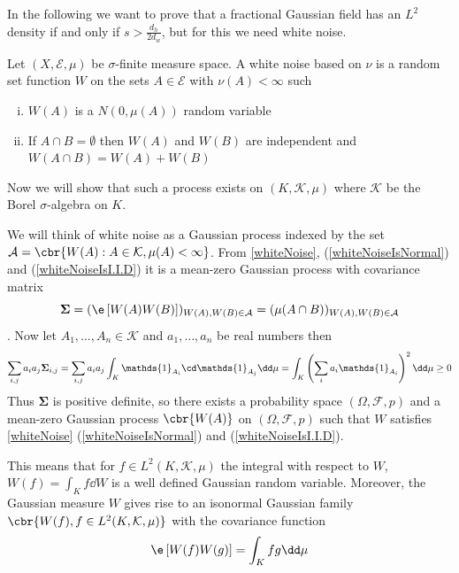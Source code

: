 In the following we want to prove that a fractional Gaussian field has an $L^2$ density if and only if $s > \frac{d_h}{2d_w}$, but for this we need white noise.

\begin{defi}\label{whiteNoise}
	Let $(X, \mathcal{E}, \mu)$ be $\sigma$-finite measure space. A white noise based on $\nu$ is a random set function $W$ on the sets $A \in \mathcal{E}$ with $\nu(A) < \infty$ such
	\begin{enumerate}[(i)]
		\item $W(A)$ is a $N(0, \mu(A))$ random variable \label{whiteNoiseIsNormal}
		\item If $A \cap B = \emptyset$ then $W(A)$ and $W(B)$ are independent and $W(A \cap B) = W(A) + W(B)$ \label{whiteNoiseIsI.I.D}
	\end{enumerate}
\end{defi}

Now we will show that such a process exists on $(K, \mathcal{K}, \mu)$ where  $\mathcal{K}$ be the Borel $\sigma$-algebra on $K$. 

We will think of white noise as a Gaussian process indexed by the set $\mathcal{A} = \cbr{W(A) : A \in \mathcal{K}, \mu(A) < \infty}$. From \cref{whiteNoise}, (\ref{whiteNoiseIsNormal}) and (\ref{whiteNoiseIsI.I.D}) it is a mean-zero Gaussian process with covariance matrix
\begin{equation}
	\mathbf{\Sigma} = (\e \left[W(A) W(B)\right])_{W(A), W(B) \in \mathcal{A}} = (\mu(A \cap B))_{W(A), W(B) \in \mathcal{A}}
\end{equation}. 
Now let $A_1, \ldots, A_n \in \mathcal{K}$ and $a_1, \ldots, a_n$ be real numbers then
\begin{equation}
	\sum_{i,j} a_i a_j \mathbf{\Sigma}_{i,j} = \sum_{i,j}a_ia_j \int_{K}\mathds{1}_{A_i} \cd \mathds{1}_{A_j} \dd \mu = \int_{K} \left(\sum_{i} a_i \mathds{1}_{A_i}\right)^2 \dd \mu \geq 0
\end{equation}
Thus $\mathbf{\Sigma}$ is positive definite, so there exists a probability space $(\Omega, \mathcal{F}, p)$ and a mean-zero Gaussian process $\cbr{W(A)}$ on $(\Omega, \mathcal{F}, p)$ such that $W$ satisfies \cref{whiteNoise} (\ref{whiteNoiseIsNormal}) and (\ref{whiteNoiseIsI.I.D}). 

This means that for $f \in L^{2}(K, \mathcal{K}, \mu)$ the integral with respect to $W$, $W(f) = \int_{K} f \dd W$ is a well defined Gaussian random variable. Moreover, the Gaussian measure $W$ gives rise to an isonormal Gaussian family $\cbr{W(f), f \in L^{2}(K, \mathcal{K}, \mu)}$ with the covariance function
\begin{equation}
	\e \left[W(f) W(g)\right] = \int_{K} fg \dd \mu
\end{equation}


